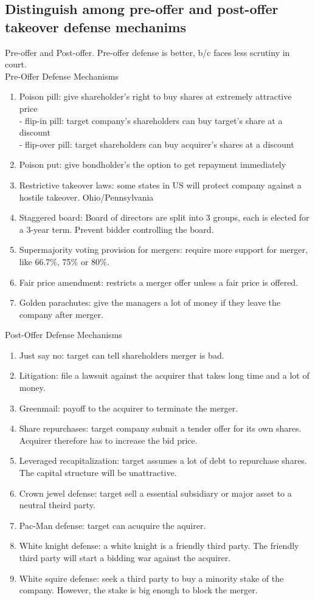 \documentclass{article}
\newcommand{\be}{\begin{enumerate}}
\newcommand{\ee}{\end{enumerate}}
\begin{document}
\subsection{Distinguish among pre-offer and post-offer takeover defense mechanims}
Pre-offer and Post-offer. Pre-offer defense is better, b/c faces less scrutiny in court.
\\Pre-Offer Defense Mechanisms
\be
    \item Poison pill: give shareholder's right to buy shares at extremely
        attractive price
        \\- flip-in pill: target company's shareholders can buy target's share at a discount
        \\- flip-over pill: target shareholders can buy acquirer's shares at a discount
    \item Poison put: give bondholder's the option to get repayment immediately
    \item Restrictive takeover laws: some states in US will protect company 
        against a hostile takeover. Ohio/Pennsylvania
    \item Staggered board: Board of directors are split into 3 groups, each is 
        elected for a 3-year term. Prevent bidder controlling the board.
    \item Supermajority voting provision for mergers: require more support for 
        merger, like 66.7\%, 75\% or 80\%.
    \item Fair price amendment: restricts a merger offer unless a fair price is offered.
    \item Golden parachutes: give the managers a lot of money if they leave the company 
        after merger.
\ee
Post-Offer Defense Mechanisms
\be
    \item Just say no: target can tell shareholders merger is bad.
    \item Litigation: file a lawsuit against the acquirer that takes long time
        and a lot of money.
    \item Greenmail: payoff to the acquirer to terminate the merger.
    \item Share repurchases: target company submit a tender offer for its own shares.
        Acquirer therefore has to increase the bid price.
    \item Leveraged recapitalization: target assumes a lot of debt to repurchase
        shares. The capital structure will be unattractive.
    \item Crown jewel defense: target sell a essential subsidiary or major asset
        to a neutral theird party.
    \item Pac-Man defense: target can acuquire the aquirer.
    \item White knight defense: a white knight is a friendly third party. The friendly
        third party will start a bidding war against the acquirer.
    \item White squire defense: seek a third party to buy a minority stake
        of the company. However, the stake is big enough to block the merger.
\ee
\end{document}
